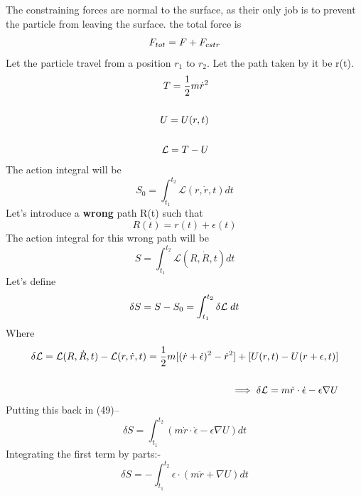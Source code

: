 \documentclass[12pt]{article}
\begin{document}
    The constraining forces are normal to the surface, as their only job is to prevent the particle from leaving the surface.
    the total force is
    \begin{equation}
        F_{tot}=F + F_{cstr} \notag
    \end{equation}
    Let the particle travel from a position $r_1$ to $r_2$. Let the path taken by it be r(t). \\
    \begin{align}
        T = \frac{1}{2}m\dot{r}^2 \notag \\ \notag \\ U = U(r,t) \notag \\ \notag \\ \mathcal{L}=T-U
    \end{align}
    The action integral will be
    \begin{equation}
        S_0 = \int_{t_1}^{t_2}\mathcal{L}(r,\dot{r},t)dt
    \end{equation}
    Let's introduce a \textbf{wrong} path R(t) such that
    \begin{equation}
        R(t)=r(t) + \epsilon(t)
    \end{equation}
    The action integral for this wrong path will be 
    \begin{equation}
        S = \int_{t_1}^{t_2}\mathcal{L}(R,\dot{R},t)dt
    \end{equation}
    Let's define 
    \begin{equation}
        \delta S = S - S_0 = \int_{t_1}^{t_2}\delta \mathcal{L}\hspace{0.1cm}dt
    \end{equation}
    Where 
    \begin{align}
        \delta \mathcal{L}=\mathcal{L}(R,\dot{R},t)-\mathcal{L}(r,\dot{r},t)=\frac{1}{2}m[(\dot{r}+\dot{\epsilon})^{2}-\dot{r}^{2}]+[U(r,t)-U(r+\epsilon,t)]\notag \\ \notag \\ \implies \delta \mathcal{L}=m \dot{r}\cdot \dot{\epsilon}-\epsilon \nabla{U}
    \end{align}
    Putting this back in (49)--
    \begin{equation}
        \delta S = \int_{t_1}^{t_2}(m \dot{r}\cdot \dot{\epsilon}-\epsilon \nabla{U})dt
    \end{equation}
    Integrating the first term by parts:-
    \begin{equation}
        \delta S = -\int_{t_1}^{t_2}\epsilon \cdot (m \ddot{r}+\nabla{U})dt
    \end{equation}
\end{document}
